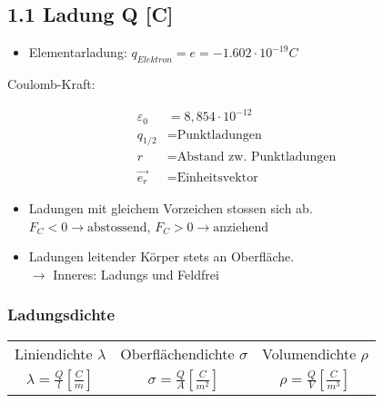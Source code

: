 \subsection{1.1 Ladung Q [C]}

\begin{itemize}
    \item Elementarladung: $q_{Elektron} = e = - 1.602 \cdot 10^{-19}C$
\end{itemize}

Coulomb-Kraft: 

\begin{minipage}{0.53\linewidth}
    \begin{footnotesize}
        \begin{center}
        \end{center}
    \end{footnotesize}
\end{minipage}
\begin{minipage}{0.46\linewidth}
    \begin{scriptsize}
        \begin{center}
            \begin{align*}
                \varepsilon_0 &= 8,854\cdot10^{-12}
                \\q_{1/2} &= \text{Punktladungen}
                \\r &= \text{Abstand zw. Punktladungen}
                \\\overrightarrow{e_r} &= \text{Einheitsvektor}
            \end{align*}
        \end{center}
    \end{scriptsize}
\end{minipage}
\vspace{1mm}



\begin{itemize}
    \item Ladungen mit gleichem Vorzeichen stossen sich ab.
    \\$F_C<0 \rightarrow \text{abstossend}$,
    $F_C>0 \rightarrow \text{anziehend}$
    \item Ladungen leitender Körper stets an Oberfläche.\\
    $\rightarrow$ Inneres: Ladungs und Feldfrei
\end{itemize}

\subsubsection*{Ladungsdichte}

\begin{tabular}{c c c}
    Liniendichte $\lambda$ & Oberflächendichte $\sigma$ & Volumendichte $\rho$ \\
    $\lambda = \frac{Q}{l} \left[\frac{C}{m}\right]$ & $\sigma = \frac{Q}{A} \left[\frac{C}{m^2}\right]$ & $\rho = \frac{Q}{V} \left[\frac{C}{m^3}\right]$
\end{tabular}

